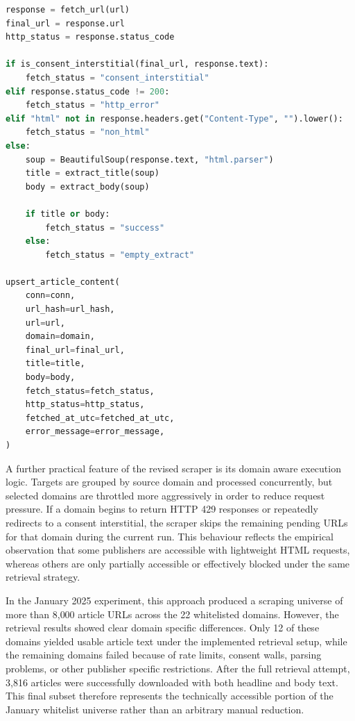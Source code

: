 \begin{lstlisting}[language=Python, caption={Simplified article retrieval and persistence loop}, label={lst:article_scrape_loop}]
response = fetch_url(url)
final_url = response.url
http_status = response.status_code

if is_consent_interstitial(final_url, response.text):
    fetch_status = "consent_interstitial"
elif response.status_code != 200:
    fetch_status = "http_error"
elif "html" not in response.headers.get("Content-Type", "").lower():
    fetch_status = "non_html"
else:
    soup = BeautifulSoup(response.text, "html.parser")
    title = extract_title(soup)
    body = extract_body(soup)

    if title or body:
        fetch_status = "success"
    else:
        fetch_status = "empty_extract"

upsert_article_content(
    conn=conn,
    url_hash=url_hash,
    url=url,
    domain=domain,
    final_url=final_url,
    title=title,
    body=body,
    fetch_status=fetch_status,
    http_status=http_status,
    fetched_at_utc=fetched_at_utc,
    error_message=error_message,
)
\end{lstlisting}

A further practical feature of the revised scraper is its domain aware execution logic. Targets are grouped by source domain and processed concurrently, but selected domains are throttled more aggressively in order to reduce request pressure. If a domain begins to return HTTP 429 responses or repeatedly redirects to a consent interstitial, the scraper skips the remaining pending URLs for that domain during the current run. This behaviour reflects the empirical observation that some publishers are accessible with lightweight HTML requests, whereas others are only partially accessible or effectively blocked under the same retrieval strategy.

In the January 2025 experiment, this approach produced a scraping universe of more than 8{,}000 article URLs across the 22 whitelisted domains. However, the retrieval results showed clear domain specific differences. Only 12 of these domains yielded usable article text under the implemented retrieval setup, while the remaining domains failed because of rate limits, consent walls, parsing problems, or other publisher specific restrictions. After the full retrieval attempt, 3{,}816 articles were successfully downloaded with both headline and body text. This final subset therefore represents the technically accessible portion of the January whitelist universe rather than an arbitrary manual reduction.

